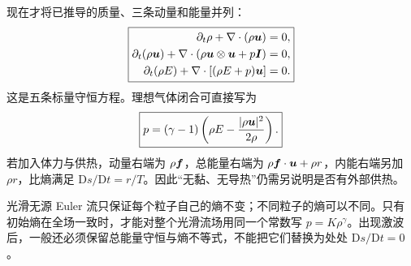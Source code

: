 现在才将已推导的质量、三条动量和能量并列：
\begin{equation}
 \boxed{\begin{aligned}
 \partial_t\rho+\nabla\cdot(\rho\bm{u})&=0,\\
 \partial_t(\rho\bm{u})+\nabla\cdot(\rho\bm{u}\otimes\bm{u}+p\bm{I})&=0,\\
 \partial_t(\rho E)+\nabla\cdot[(\rho E+p)\bm{u}]&=0.
 \end{aligned}}\label{eq:euler}
\end{equation}
这是五条标量守恒方程。理想气体闭合可直接写为
\begin{equation}
 \boxed{p=(\gamma-1)\left(\rho E-\frac{|\rho\bm{u}|^2}{2\rho}\right).}
 \label{eq:pressure-conservative}
\end{equation}
若加入体力与供热，动量右端为 $\rho\bm{f}$，总能量右端为 $\rho\bm{f}\cdot\bm{u}+\rho r$，内能右端另加 $\rho r$，比熵满足 $\mathrm Ds/\mathrm Dt=r/T$。因此“无黏、无导热”仍需另说明是否有外部供热。

\begin{warningbox}
光滑无源 Euler 流只保证每个粒子自己的熵不变；不同粒子的熵可以不同。只有初始熵在全场一致时，才能对整个光滑流场用同一个常数写 $p=K\rho^\gamma$。出现激波后，一般还必须保留总能量守恒与熵不等式，不能把它们替换为处处 $\mathrm Ds/\mathrm Dt=0$。
\end{warningbox}
